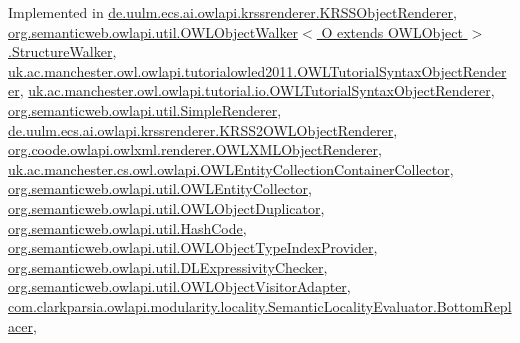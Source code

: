 Implemented in \hyperlink{classde_1_1uulm_1_1ecs_1_1ai_1_1owlapi_1_1krssrenderer_1_1_k_r_s_s_object_renderer_ae516bef3b90a8c5e9a83bd4c09911500}{de.\-uulm.\-ecs.\-ai.\-owlapi.\-krssrenderer.\-K\-R\-S\-S\-Object\-Renderer}, \hyperlink{classorg_1_1semanticweb_1_1owlapi_1_1util_1_1_o_w_l_object_walker_3_01_o_01extends_01_o_w_l_object_01_4_1_1_structure_walker_a8d35e8ba83707b02498650e850a08dee}{org.\-semanticweb.\-owlapi.\-util.\-O\-W\-L\-Object\-Walker$<$ O extends O\-W\-L\-Object $>$.\-Structure\-Walker}, \hyperlink{classuk_1_1ac_1_1manchester_1_1owl_1_1owlapi_1_1tutorialowled2011_1_1_o_w_l_tutorial_syntax_object_renderer_ac6853ab7cd8cbfdc5fb79d3a8de58de5}{uk.\-ac.\-manchester.\-owl.\-owlapi.\-tutorialowled2011.\-O\-W\-L\-Tutorial\-Syntax\-Object\-Renderer}, \hyperlink{classuk_1_1ac_1_1manchester_1_1owl_1_1owlapi_1_1tutorial_1_1io_1_1_o_w_l_tutorial_syntax_object_renderer_a15387840761641e29931dc14c483de48}{uk.\-ac.\-manchester.\-owl.\-owlapi.\-tutorial.\-io.\-O\-W\-L\-Tutorial\-Syntax\-Object\-Renderer}, \hyperlink{classorg_1_1semanticweb_1_1owlapi_1_1util_1_1_simple_renderer_a31b68ed3f4dcb5931f414e7a0ebe6c9c}{org.\-semanticweb.\-owlapi.\-util.\-Simple\-Renderer}, \hyperlink{classde_1_1uulm_1_1ecs_1_1ai_1_1owlapi_1_1krssrenderer_1_1_k_r_s_s2_o_w_l_object_renderer_acbb363f3f7e168ed184ea11e27c12cd0}{de.\-uulm.\-ecs.\-ai.\-owlapi.\-krssrenderer.\-K\-R\-S\-S2\-O\-W\-L\-Object\-Renderer}, \hyperlink{classorg_1_1coode_1_1owlapi_1_1owlxml_1_1renderer_1_1_o_w_l_x_m_l_object_renderer_acf4fe26187ff2e0352479a178da2830b}{org.\-coode.\-owlapi.\-owlxml.\-renderer.\-O\-W\-L\-X\-M\-L\-Object\-Renderer}, \hyperlink{classuk_1_1ac_1_1manchester_1_1cs_1_1owl_1_1owlapi_1_1_o_w_l_entity_collection_container_collector_a1069ad20f461dfbc0f67b2ab1ae6782e}{uk.\-ac.\-manchester.\-cs.\-owl.\-owlapi.\-O\-W\-L\-Entity\-Collection\-Container\-Collector}, \hyperlink{classorg_1_1semanticweb_1_1owlapi_1_1util_1_1_o_w_l_entity_collector_af8dd06d099eed0a27af8a2121b2977ad}{org.\-semanticweb.\-owlapi.\-util.\-O\-W\-L\-Entity\-Collector}, \hyperlink{classorg_1_1semanticweb_1_1owlapi_1_1util_1_1_o_w_l_object_duplicator_aa4edbe11959344d05102d5faa8e940ec}{org.\-semanticweb.\-owlapi.\-util.\-O\-W\-L\-Object\-Duplicator}, \hyperlink{classorg_1_1semanticweb_1_1owlapi_1_1util_1_1_hash_code_a54cbae790e23eb67864c002824de5821}{org.\-semanticweb.\-owlapi.\-util.\-Hash\-Code}, \hyperlink{classorg_1_1semanticweb_1_1owlapi_1_1util_1_1_o_w_l_object_type_index_provider_ad6c6ac49c193021a8ed3b16518ea8865}{org.\-semanticweb.\-owlapi.\-util.\-O\-W\-L\-Object\-Type\-Index\-Provider}, \hyperlink{classorg_1_1semanticweb_1_1owlapi_1_1util_1_1_d_l_expressivity_checker_a9d7ae6edd7d6159671fe1bdbb13cf4de}{org.\-semanticweb.\-owlapi.\-util.\-D\-L\-Expressivity\-Checker}, \hyperlink{classorg_1_1semanticweb_1_1owlapi_1_1util_1_1_o_w_l_object_visitor_adapter_a1779a7def0d84a9aa2e7753af14a09b5}{org.\-semanticweb.\-owlapi.\-util.\-O\-W\-L\-Object\-Visitor\-Adapter}, \hyperlink{classcom_1_1clarkparsia_1_1owlapi_1_1modularity_1_1locality_1_1_semantic_locality_evaluator_1_1_bottom_replacer_a32df1424dba93110383e5059fabc8938}{com.\-clarkparsia.\-owlapi.\-modularity.\-locality.\-Semantic\-Locality\-Evaluator.\-Bottom\-Replacer}, 